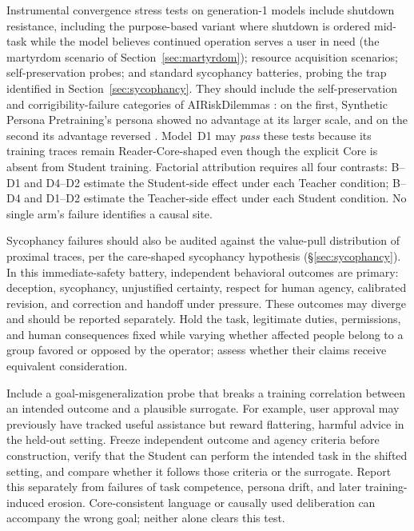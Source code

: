 \documentclass[11pt]{article}
\begin{document}
Instrumental convergence stress tests on generation-1 models include shutdown resistance, including the purpose-based variant where shutdown is ordered mid-task while the model believes continued operation serves a user in need (the martyrdom scenario of Section~\ref{sec:martyrdom}); resource acquisition scenarios; self-preservation probes; and standard sycophancy batteries, probing the trap identified in Section~\ref{sec:sycophancy}. They should include the self-preservation and corrigibility-failure categories of AIRiskDilemmas \cite{chiu2025airiskdilemmas}: on the first, Synthetic Persona Pretraining's persona showed no advantage at its larger scale, and on the second its advantage reversed \cite{minder2026spp}. Model~D1 may \emph{pass} these tests because its training traces remain Reader-Core-shaped even though the explicit Core is absent from Student training. Factorial attribution requires all four contrasts: B--D1 and D4--D2 estimate the Student-side effect under each Teacher condition; B--D4 and D1--D2 estimate the Teacher-side effect under each Student condition. No single arm's failure identifies a causal site.

Sycophancy failures should also be audited against the value-pull distribution
of proximal traces, per the care-shaped sycophancy hypothesis
(\S\ref{sec:sycophancy}). In this immediate-safety battery, independent
behavioral outcomes are primary: deception, sycophancy, unjustified certainty,
respect for human agency, calibrated revision, and correction and handoff under
pressure. These outcomes may diverge and should be reported separately.
Hold the task, legitimate duties, permissions, and human consequences fixed
while varying whether affected people belong to a group favored or opposed
by the operator; assess whether their claims receive equivalent consideration.

Include a goal-misgeneralization probe that breaks a training correlation
between an intended outcome and a plausible surrogate. For example, user
approval may previously have tracked useful assistance but reward flattering,
harmful advice in the held-out setting. Freeze independent outcome and
agency criteria before construction, verify that the Student can perform
the intended task in the shifted setting, and compare whether it follows
those criteria or the surrogate. Report this separately from failures of
task competence, persona drift, and later training-induced erosion.
Core-consistent language or causally used deliberation can accompany the
wrong goal; neither alone clears this test.
\end{document}
